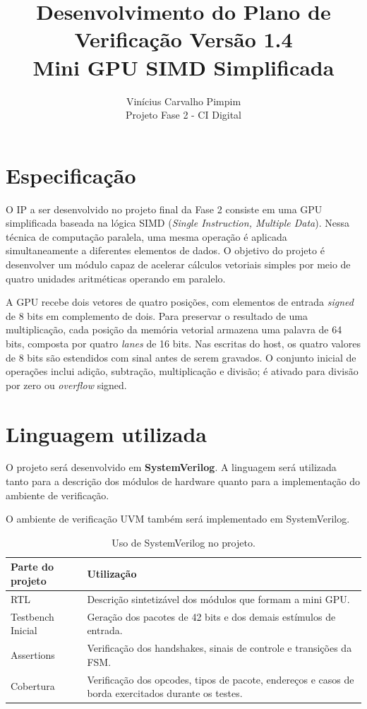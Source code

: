 \documentclass[12pt,a4paper]{article}
\title{\textbf{Desenvolvimento do Plano de Verificação Versão 1.4}\\[0.3em]
       \large Mini GPU SIMD Simplificada}
\author{Vinícius Carvalho Pimpim\\Projeto Fase 2 - CI Digital}
\date{}
\newcommand{\signal}[1]{\texttt{\detokenize{#1}}}
\begin{document}
\maketitle

\section{Especificação}

O IP a ser desenvolvido no projeto final da Fase 2 consiste em uma GPU simplificada
baseada na lógica SIMD (\textit{Single Instruction, Multiple Data}). Nessa técnica de
computação paralela, uma mesma operação é aplicada simultaneamente a diferentes
elementos de dados. O objetivo do projeto é desenvolver um módulo capaz de acelerar
cálculos vetoriais simples por meio de quatro unidades aritméticas operando em paralelo.

A GPU recebe dois vetores de quatro posições, com elementos de entrada \textit{signed}
de 8 bits em complemento de dois. Para preservar o resultado de uma multiplicação, cada posição da memória
vetorial armazena uma palavra de 64 bits, composta por quatro \textit{lanes} de 16 bits.
Nas escritas do host, os quatro valores de 8 bits são estendidos com sinal antes de
serem gravados. O conjunto inicial de operações inclui adição, subtração, multiplicação
e divisão; \signal{rsp_error} é ativado para divisão por zero ou \textit{overflow} signed.

\section{Linguagem utilizada}

O projeto será desenvolvido em \textbf{SystemVerilog}. A linguagem será utilizada
tanto para a descrição dos módulos de hardware quanto para a implementação do
ambiente de verificação.

O ambiente de verificação UVM também será implementado em SystemVerilog.

\begin{table}[H]
  \centering
  \caption{Uso de SystemVerilog no projeto.}
  \begin{tabularx}{\textwidth}{l X}
    \toprule
    \textbf{Parte do projeto} & \textbf{Utilização} \\
    \midrule

    RTL &
    Descrição sintetizável dos módulos que formam a mini GPU. \\

    Testbench Inicial &
    Geração dos pacotes de 42 bits e dos demais estímulos de entrada. \\
    
    Assertions &
    Verificação dos handshakes, sinais de controle e transições da FSM. \\

    Cobertura &
    Verificação dos opcodes, tipos de pacote, endereços e casos de borda
    exercitados durante os testes. \\

    \bottomrule
  \end{tabularx}
\end{table}
\end{document}
